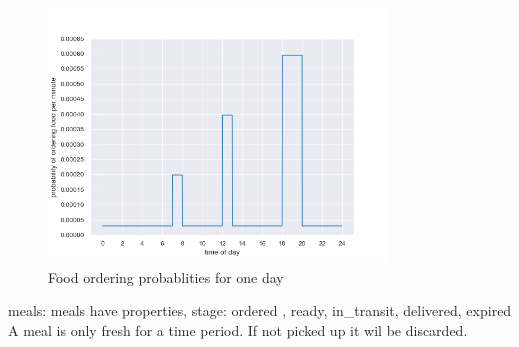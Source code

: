 \begin{figure}
    \centering
    \includegraphics[width=9cm]{sections/pics/food_ordering_distribution}
    \caption{Food ordering probablities for one day}
    \label{fig:food_ordering_distribution}
\end{figure}



meals:
meals have properties, stage: ordered , ready, in\_transit, delivered, expired
A meal is only fresh for a time period.
If not picked up it wil be discarded.





